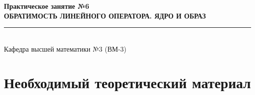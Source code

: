 \documentclass[12pt,a4paper]{article}
\theoremstyle{plain}
\theoremstyle{definition}
\begin{document}
\begin{center}
    \vspace{-0.5cm}
    {\Large\color{mireaMain}\textbf{Практическое занятие №6}} \\[0.3cm]
    {\Huge\color{mireaMain}\textbf{ОБРАТИМОСТЬ ЛИНЕЙНОГО ОПЕРАТОРА. ЯДРО И ОБРАЗ}} \\[0.3cm]
    \rule{0.4\textwidth}{1pt} \\[0.2cm]
    {\small Кафедра высшей математики №3 (ВМ-3)}
\end{center}

\vspace{0.2cm}

\section*{Необходимый теоретический материал}
\end{document}
